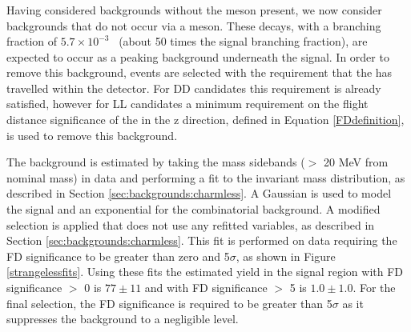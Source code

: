 \subsubsection{\boldmath \decay{\Bm}{\D\pim\pip\pim}}
\label{sec:backgrounds:b2dpipipi}

Having considered backgrounds without the \Dz meson present, we now consider backgrounds that do not occur via a \KS meson. These \decay{\Bm}{\D\pim\pip\pim} decays, with a branching fraction of $5.7 \times 10^{-3}$~\cite{PDG2014} (about 50 times the signal \decay{\Bm}{\D\Kstarm(\KS(\pip\pim)\pim)} branching fraction), are expected to occur as a peaking background underneath the signal. In order to remove this background, events are selected with the requirement that the \KS has travelled within the detector. For DD candidates this requirement is already satisfied, however for LL candidates a minimum requirement on the flight distance significance of the \KS in the z direction, defined in Equation \ref{FDdefinition}, is used to remove this background. 

The \decay{\Bm}{\D\pim\pip\pim} background is estimated by taking the \KS mass sidebands ($>$ 20 MeV from nominal \KS mass) in data and performing a fit to the invariant \Bm mass distribution, as described in Section \ref{sec:backgrounds:charmless}. A Gaussian is used to model the signal and an exponential for the combinatorial background. A modified selection is applied that does not use any refitted variables, as described in Section \ref{sec:backgrounds:charmless}. This fit is performed on \kpi data requiring the \KS FD significance to be greater than zero and 5$\sigma$, as shown in Figure \ref{strangelessfits}. Using these fits the estimated \decay{\Bm}{\D\pim\pip\pim} yield in the signal region with \KS FD significance $>$ 0 is $77 \pm 11$ and with \KS FD significance $>$ 5 is $1.0 \pm 1.0$. For the final selection, the \KS FD significance is required to be greater than 5$\sigma$ as it suppresses the \decay{\Bm}{\D\pim\pip\pim} background to a negligible level.

